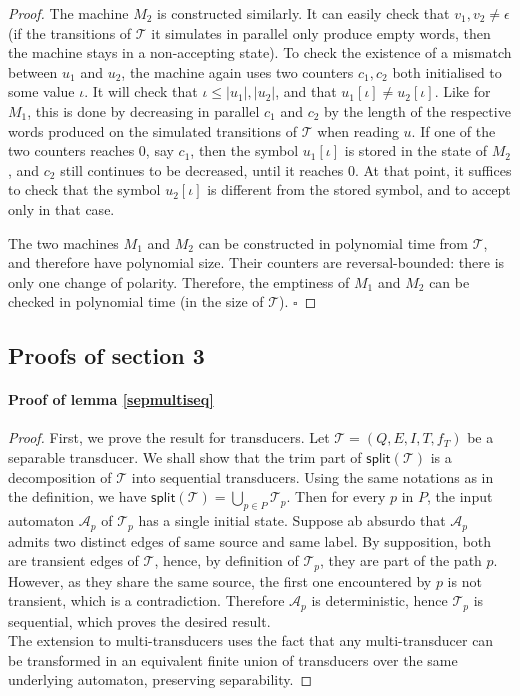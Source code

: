 \documentclass[envcountsame]{llncs}
\newcommand\tra{\mathcal{T}}
\newcommand\eof{\hfill$\square$}
\begin{document}
\begin{proof}
The machine $M_2$ is constructed similarly. It can easily check that
$v_1,v_2\neq \epsilon$ (if the transitions of $\tra$ it simulates in
parallel only produce empty words, then the machine stays in a
non-accepting state). To check the existence of a mismatch between
$u_1$ and $u_2$, the machine again uses two counters $c_1,c_2$
both initialised to some value $\iota$. It will check that $\iota \leq
|u_1|,|u_2|$, and that $u_1[\iota]\neq u_2[\iota]$. Like for $M_1$, this is done by
decreasing in parallel $c_1$ and $c_2$ by the length of the respective
words produced on the simulated transitions of $\tra$ when reading
$u$. If one of the two counters reaches $0$, say $c_1$, then the
symbol $u_1[\iota]$ is stored in the state of $M_2$, and $c_2$ still
continues to be decreased, until it reaches $0$. At that point, it
suffices to check that the symbol $u_2[\iota]$ is different from the
stored symbol, and to accept only in that case. 


The two machines $M_1$ and $M_2$ can be constructed in polynomial time
from $\tra$, and therefore have polynomial size. Their counters are
reversal-bounded: there is only one change of polarity. Therefore, the
emptiness of $M_1$ and $M_2$ can be checked in polynomial time (in the
size of $\tra$). \eof
\end{proof}










\subsection*{Proofs of section 3}

\paragraph{Proof of lemma \ref{sepmultiseq}}

\begin{proof}
First, we prove the result for transducers.
Let $\tra = (Q,E,I,T,f_T)$ be a separable transducer.
We shall show that the trim part of $\textsf{split}(\tra)$ is a decomposition of $\tra$ into sequential transducers.
Using the same notations as in the definition, we have
$\textsf{split}(\tra) = \bigcup_{p \in P}\tra_p.$
Then for every $p$ in $P$, the input automaton $\mathcal{A}_p$ of $\tra_p$ has a single initial state.
Suppose ab absurdo that $\mathcal{A}_p$ admits two distinct edges of same source and same label.
By supposition, both are transient edges of $\tra$, hence, by definition of $\tra_p$, they are part of the path $p$.
However, as they share the same source, the first one encountered by $p$ is not transient, which is a contradiction.
Therefore $\mathcal{A}_p$ is deterministic, hence $\tra_p$ is sequential, which proves the desired result.\\
The extension to multi-transducers uses the fact that any multi-transducer can be transformed in an equivalent finite union of transducers over the same underlying automaton, preserving separability.
\end{proof}
\end{document}
